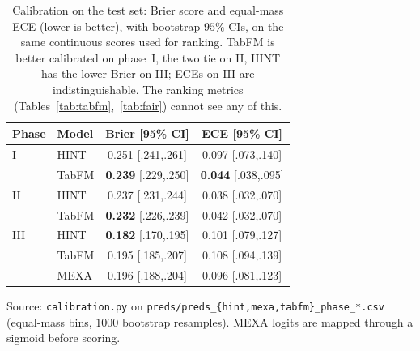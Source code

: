 \documentclass[a4paper,fleqn]{cas-sc}
\begin{document}
\begin{table}[t]
\centering\small
\caption{Calibration on the test set: Brier score and equal-mass ECE (lower is better), with
bootstrap $95\%$ CIs, on the same continuous scores used for ranking. TabFM is better
calibrated on phase~I, the two tie on II, HINT has the lower Brier on III; ECEs on III are
indistinguishable. The ranking metrics (Tables~\ref{tab:tabfm},~\ref{tab:fair}) cannot see any
of this.}
\label{tab:calib}
\begin{tabular}{llcc}
\toprule
Phase & Model & Brier {\scriptsize[95\% CI]} & ECE {\scriptsize[95\% CI]} \\
\midrule
I   & HINT  & 0.251 {\scriptsize[.241,.261]} & 0.097 {\scriptsize[.073,.140]} \\
    & TabFM & \textbf{0.239} {\scriptsize[.229,.250]} & \textbf{0.044} {\scriptsize[.038,.095]} \\
II  & HINT  & 0.237 {\scriptsize[.231,.244]} & 0.038 {\scriptsize[.032,.070]} \\
    & TabFM & \textbf{0.232} {\scriptsize[.226,.239]} & 0.042 {\scriptsize[.032,.070]} \\
III & HINT  & \textbf{0.182} {\scriptsize[.170,.195]} & 0.101 {\scriptsize[.079,.127]} \\
    & TabFM & 0.195 {\scriptsize[.185,.207]} & 0.108 {\scriptsize[.094,.139]} \\
    & MEXA  & 0.196 {\scriptsize[.188,.204]} & 0.096 {\scriptsize[.081,.123]} \\
\bottomrule
\end{tabular}
\begin{minipage}{\linewidth}\vspace{2pt}\scriptsize Source: \texttt{calibration.py} on \texttt{preds/preds\_\{hint,mexa,tabfm\}\_phase\_*.csv} (equal-mass bins, $1000$ bootstrap resamples). MEXA logits are mapped through a sigmoid before scoring. \end{minipage}
\end{table}
\end{document}

